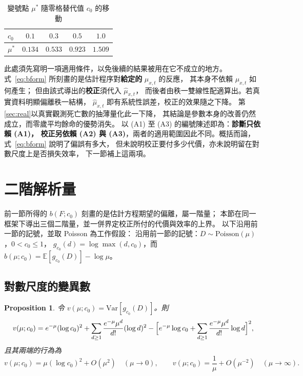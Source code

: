 \documentclass[UTF8, fontset=macnew, a4paper, 12pt]{ctexart}
\newtheorem{prop}{Proposition}
\newcommand{\Ex}{\mathbb{E}}
\begin{document}
\begin{table}[H]
\centering
\caption{變號點 $\mu^{\ast}$ 隨零格替代值 $c_0$ 的移動}
\footnotesize
\begin{tabular}{lcccc}
\toprule
$c_0$       & $0.1$ & $0.3$ & $0.5$ & $1.0$\\
\midrule
$\mu^{\ast}$ & $0.134$ & $0.533$ & $0.923$ & $1.509$\\
\bottomrule
\end{tabular}
\label{tab:c0shift}
\end{table}

此處須先寫明一項適用條件，以免後續的結果被用在它不成立的地方。
式~\eqref{eq:bform} 所刻畫的是估計程序對\textbf{給定的} $\mu_{x,t}$ 的反應，
其本身不依賴 $\mu_{x,t}$ 如何產生；
但由該式導出的\textbf{校正}須代入 $\hat\mu_{x,t}$，
而後者由秩一雙線性配適算出。若真實資料明顯偏離秩一結構，
$\hat\mu_{x,t}$ 即有系統性誤差，校正的效果隨之下降。
第\ref{sec:real}以真實觀測死亡數的抽薄量化此一下降，
其結論是參數本身的改善仍然成立，而零歲平均餘命的優勢消失。
以 (A1) 至 (A3) 的編號陳述即為：\textbf{診斷只依賴 (A1)，
校正另依賴 (A2) 與 (A3)}，兩者的適用範圍因此不同。概括而論，式~\eqref{eq:bform} 說明了偏誤有多大，
但未說明校正要付多少代價，亦未說明留在對數尺度上是否損失效率，
下一節補上這兩項。


\section{二階解析量}\label{sec:second2}

前一節所得的 $b(F;c_0)$ 刻畫的是估計方程期望的偏離，屬一階量；
本節在同一框架下導出三個二階量，並一併界定校正所付的代價與效率的上界。
以下沿用前一節的記號，並取 Poisson 為工作假設：
沿用前一節的記號：$D\sim\text{Poisson}(\mu)$，$0<c_0\le1$，
$g_{c_0}(d)=\log\max(d,c_0)$，而 $b(\mu;c_0)=\Ex[g_{c_0}(D)]-\log\mu$。

\subsection{對數尺度的變異數}\label{subsec:vfun}

\begin{prop}\label{prop:v}
令 $v(\mu;c_0)=\mathrm{Var}[g_{c_0}(D)]$。則
\begin{equation}\label{eq:v}
v(\mu;c_0)=e^{-\mu}(\log c_0)^2+\sum_{d\ge1}\frac{e^{-\mu}\mu^{d}}{d!}(\log d)^2
-\Bigl[e^{-\mu}\log c_0+\sum_{d\ge1}\frac{e^{-\mu}\mu^{d}}{d!}\log d\Bigr]^{2},
\end{equation}
且其兩端的行為為
\[
v(\mu;c_0)=\mu(\log c_0)^2+O(\mu^2)\quad(\mu\to0),\qquad
v(\mu;c_0)=\frac{1}{\mu}+O(\mu^{-2})\quad(\mu\to\infty).
\]
\end{prop}
\end{document}
